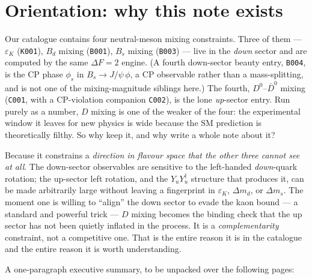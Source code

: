 \documentclass[11pt]{article}
\newcommand{\eps}{\varepsilon}
\newcommand{\code}[1]{\texttt{#1}}
\newcommand{\Dz}{D^0}
\newcommand{\Dzbar}{\bar D^0}
\newcommand{\Yu}{Y_u}
\theoremstyle{definition}
\begin{document}
\part*{Orientation: why this note exists}

Our catalogue contains four neutral-meson mixing constraints. Three of them ---
$\eps_K$ (\code{K001}), $B_d$ mixing (\code{B001}), $B_s$ mixing (\code{B003})
--- live in the \emph{down} sector and are computed by the same
$\Delta F=2$ engine. (A fourth down-sector beauty entry, \code{B004}, is the
CP phase $\phi_s$ in $B_s\to J/\psi\,\phi$, a CP observable rather than a
mass-splitting, and is not one of the mixing-magnitude siblings here.) The fourth, $\Dz$--$\Dzbar$ mixing (\code{C001}, with a
CP-violation companion \code{C002}), is the lone \emph{up}-sector entry. Run
purely as a number, $D$ mixing is one of the weaker of the four: the
experimental window it leaves for new physics is wide because the SM prediction
is theoretically filthy. So why keep it, and why write a whole note about it?

Because it constrains a \emph{direction in flavour space that the other three
cannot see at all}. The down-sector observables are sensitive to the
left-handed \emph{down}-quark rotation; the up-sector left rotation, and the
$\Yu\Yu^\dagger$ structure that produces it, can be made arbitrarily large
without leaving a fingerprint in $\eps_K$, $\Delta m_d$, or $\Delta m_s$. The
moment one is willing to ``align'' the down sector to evade the kaon bound ---
a standard and powerful trick --- $D$ mixing becomes the binding check that the
up sector has not been quietly inflated in the process. It is a
\emph{complementarity} constraint, not a competitive one. That is the entire
reason it is in the catalogue and the entire reason it is worth understanding.

A one-paragraph executive summary, to be unpacked over the following pages:
\end{document}

